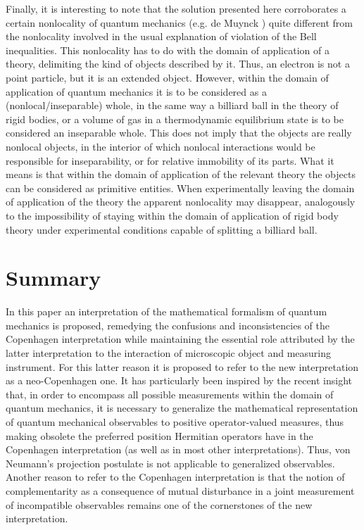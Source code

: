 \documentclass[12pt]{article}
\begin{document}
Finally, it is interesting to note that the solution presented
here corroborates a certain nonlocality of quantum mechanics (e.g.
de Muynck \cite{dM84}) quite different from the nonlocality
involved in the usual explanation of violation of the Bell
inequalities. This nonlocality has to do with the domain of
application of a theory, delimiting the kind of objects described
by it. Thus, an electron is not a point particle, but it is an
extended object. However, within the domain of application of
quantum mechanics it is to be considered as a
(nonlocal/inseparable) whole, in the same way a billiard ball in
the theory of rigid bodies, or a volume of gas in a thermodynamic
equilibrium state is to be considered an inseparable whole. This
does not imply that the objects are really nonlocal objects, in
the interior of which nonlocal interactions would be responsible
for inseparability, or for relative immobility of its parts. What
it means is that within the domain of application of the relevant
theory the objects can be considered as primitive entities. When
experimentally leaving the domain of application of the theory the
apparent nonlocality may disappear, analogously to the
impossibility of staying within the domain of application of rigid
body theory under experimental conditions capable of splitting a
billiard ball.

\section{Summary}
\label{sec5} In this paper an interpretation of the mathematical
formalism of quantum mechanics is proposed, remedying the
confusions and inconsistencies of the Copenhagen interpretation
while maintaining the essential role attributed by the latter
interpretation to the interaction of microscopic object and
measuring instrument. For this latter reason it is proposed to
refer to the new interpretation as a neo-Copenhagen one. It has
particularly been inspired by the recent insight that, in order to
encompass all possible measurements within the domain of quantum
mechanics, it is necessary to generalize the mathematical
representation of quantum mechanical observables to positive
operator-valued measures, thus making obsolete the preferred
position Hermitian operators have in the Copenhagen interpretation
(as well as in most other interpretations). Thus, von Neumann's
projection postulate is not applicable to generalized observables.
Another reason to refer to the Copenhagen interpretation is that the
notion of complementarity as a consequence of mutual disturbance
in a joint measurement of incompatible observables remains one of
the cornerstones of the new interpretation.
\end{document}
